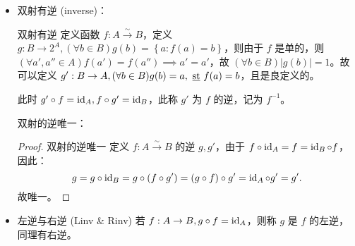 \begin{itemize}
    \item 双射有逆 (inverse)：
          \begin{theo}{双射有逆}{}
              定义函数 \(f: A\stackrel{\sim}{\to }B\)，定义 \(g: B \to 2^A, (\forall b\in B)g(b) = \left\{ a : f(a) = b \right\} \)，则由于 \(f\) 是单的，则 \((\forall a',a''\in A)f(a') = f(a'') \implies a' = a'\)，故 \((\forall b\in B ) |g(b)| = 1\)。故可以定义 \(g': B \to A, (\forall b\in B) g(b) = a, \text{ \underline{st} } f(a) = b\)，且是良定义的。

              此时 \(g'\circ f = \operatorname{id}_A, f\circ g' = \operatorname{id}_B\)，此称 \(g'\) 为 \(f\) 的逆，记为 \(f^{-1} \)。
          \end{theo}

          双射的逆唯一：
          \begin{proof}{双射的逆唯一}
              定义 \(f : A \stackrel{\sim}{\to} B\) 的逆 \(g,g'\)，由于 \(f\circ\operatorname{id}_A = f = \operatorname{id}_B\circ f\)，因此：
              \[
                  g = g\circ \operatorname{id}_B = g\circ (f \circ g') = (g \circ f) \circ g' = \operatorname{id}_A \circ g' = g'
                  .\]
              故唯一。
          \end{proof}
    \item 左逆与右逆 (Linv \& Rinv)
          若 \(f: A\to B, g\circ f = \operatorname{id}_A\)，则称 \(g\) 是 \(f\) 的左逆，同理有右逆。


\end{itemize}
